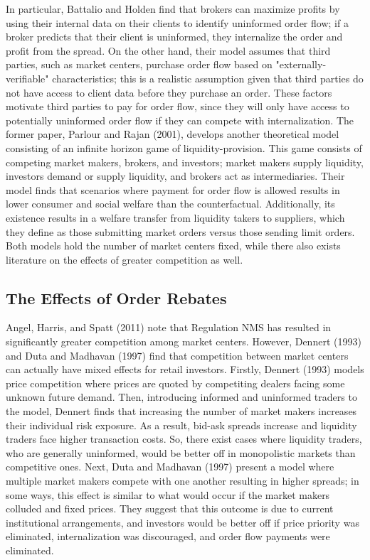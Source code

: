 \documentclass[11pt,a4paper]{article}
\begin{document}
In particular, Battalio and Holden find that brokers can maximize profits by using their internal data on their clients to identify uninformed order flow; if a broker predicts that their client is uninformed, they internalize the order and profit from the spread. On the other hand, their model assumes that third parties, such as market centers, purchase order flow based on "externally-verifiable" characteristics; this is a realistic assumption given that third parties do not have access to client data before they purchase an order. These factors motivate third parties to pay for order flow, since they will only have access to potentially uninformed order flow if they can compete with internalization. The former paper, Parlour and Rajan (2001), develops another theoretical model consisting of an infinite horizon game of liquidity-provision. This game consists of competing market makers, brokers, and investors; market makers supply liquidity, investors demand or supply liquidity, and brokers act as intermediaries. Their model finds that scenarios where payment for order flow is allowed results in lower consumer and social welfare than the counterfactual. Additionally, its existence results in a welfare transfer from liquidity takers to suppliers, which they define as those submitting market orders versus those sending limit orders. Both models hold the number of market centers fixed, while there also exists literature on the effects of greater competition as well. 

\subsection{The Effects of Order Rebates}

Angel, Harris, and Spatt (2011) note that Regulation NMS has resulted in significantly greater competition among market centers. However, Dennert (1993) and Duta and Madhavan (1997) find that competition between market centers can actually have mixed effects for retail investors. Firstly, Dennert (1993) models price competition where prices are quoted by competiting dealers facing some unknown future demand. Then, introducing informed and uninformed traders to the model, Dennert finds that increasing the number of market makers increases their individual risk exposure. As a result, bid-ask spreads increase and liquidity traders face higher transaction costs. So, there exist cases where liquidity traders, who are generally uninformed, would be better off in monopolistic markets than competitive ones. Next, Duta and Madhavan (1997) present a model where multiple market makers compete with one another resulting in higher spreads; in some ways, this effect is similar to what would occur if the market makers colluded and fixed prices. They suggest that this outcome is due to current institutional arrangements, and investors would be better off if price priority was eliminated, internalization was discouraged, and order flow payments were eliminated. 
\end{document}
